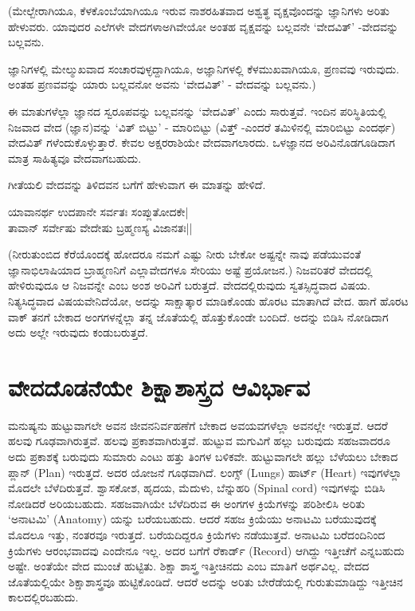 (ಮೇಲ್ಬೇರಾಗಿಯೂ, ಕೆಳಕೊಂಬೆಯಾಗಿಯೂ ಇರುವ ನಾಶರಹಿತವಾದ ಅಶ್ವತ್ಥ  ವೃಕ್ಷವೊಂದನ್ನು ಜ್ಞಾನಿಗಳು ಅರಿತು ಹೇಳುವರು. ಯಾವುದರ ಎಲೆಗಳೇ ವೇದಗಳಾಅಗಿವೇಯೋ ಅಂತಹ ವೃಕ್ಷವನ್ನು ಬಲ್ಲವನೇ `ವೇದವಿತ್' -ವೇದವನ್ನು  ಬಲ್ಲವನು.

ಜ್ಞಾನಿಗಳಲ್ಲಿ ಮೇಲ್ಮುಖವಾದ ಸಂಚಾರವುಳ್ಳದ್ದಾಗಿಯೂ, ಅಜ್ಞಾನಿಗಳಲ್ಲಿ ಕೆಳಮುಖವಾಗಿಯೂ, ಪ್ರಣವವು ಇರುವುದು. ಅಂತಹ ಪ್ರಣವವನ್ನು ಯಾರು ಬಲ್ಲವನೋ ಅವನು `ವೇದವಿತ್' - ವೇದವನ್ನು ಬಲ್ಲವನು.)

ಈ ಮಾತುಗಳೆಲ್ಲಾ ಜ್ಞಾನದ ಸ್ವರೂಪವನ್ನು ಬಲ್ಲವನನ್ನು `ವೇದವಿತ್' ಎಂದು ಸಾರುತ್ತವೆ. ಇಂದಿನ ಪರಿಸ್ಥಿತಿಯಲ್ಲಿ ನಿಜವಾದ ವೇದ (ಜ್ಞಾನ)ವನ್ನು `ವಿತ್ ಬಿಟ್ಟು' - ಮಾರಿಬಿಟ್ಟು (ವಿತ್ತ್ -ಎಂದರೆ ತಮಿಳಿನಲ್ಲಿ ಮಾರಿಬಿಟ್ಟು ಎಂದರ್ಥ) ವೇದವಿತ್ ಗಳೆಂದುಕೊಳ್ಳುತ್ತಾರೆ. ಕೇವಲ ಅಕ್ಷರರಾಶಿಯೇ ವೇದವಾಗಲಾರದು. ಒಳಜ್ಞಾನದ ಅರಿವಿನೊಡಗೂಡಿದಾಗ ಮಾತ್ರ  ಸಾಹಿತ್ಯವೂ ವೇದವಾಗಬಹುದು.

ಗೀತೆಯಲಿ ವೇದವನ್ನು ತಿಳಿದವನ ಬಗೆಗೆ ಹೇಳುವಾಗ ಈ ಮಾತನ್ನು ಹೇಳಿದೆ.
\begin{shloka}
ಯಾವಾನರ್ಥ ಉದಪಾನೇ ಸರ್ವತಃ ಸಂಪ್ಲುತೋದಕೇ|\\
ತಾವಾನ್ ಸರ್ವೇಷು ವೇದೇಷು ಬ್ರಹ್ಮಣಸ್ಯ ವಿಜಾನತಃ||
\end{shloka}

(ನೀರುತುಂಬಿದ ಕೆರೆಯೊಂದಕ್ಕೆ  ಹೋದರೂ ನಮಗೆ ಎಷ್ಟು ನೀರು ಬೇಕೋ ಅಷ್ಟನ್ನೇ ನಾವು ಪಡೆಯುವಂತೆ ಜ್ಞಾನಾಭಿಲಾಷಿಯಾದ ಬ್ರಾಹ್ಮಣನಿಗೆ ಎಲ್ಲಾವೇದಗಳೂ ಸೇರಿಯು ಅಷ್ಟೆ ಪ್ರಯೋಜನ.) ನಿಜವರಿತರೆ ವೇದದಲ್ಲಿ ಹೇಳಿರುವುದೂ ಆ ನಿಜವನ್ನೇ ಎಂಬ ಅಂಶ ಅರಿವಿಗೆ ಬರುತ್ತದೆ. ವೇದದಲ್ಲಿರುವುದು ಸ್ವತಸ್ಸಿದ್ಧವಾದ ವಿಷಯ. ನಿತ್ಯಸಿದ್ಧವಾದ ವಿಷಯವೇನಿದೆಯೋ, ಅದನ್ನು ಸಾಕ್ಷಾತ್ಕಾರ ಮಾಡಿಕೊಂಡು ಹೊರಟ ಮಾತಾಗಿದೆ ವೇದ. ಹಾಗೆ ಹೊರಟ ವಾಕ್ ತನಗೆ ಬೇಕಾದ ಅಂಗಗಳನ್ನೆಲ್ಲಾ ತನ್ನ ಜೊತೆಯಲ್ಲಿ ಹೊತ್ತುಕೊಂಡೇ ಬಂದಿದೆ. ಅದನ್ನು ಬಿಡಿಸಿ ನೋಡಿದಾಗ ಅದು ಅಲ್ಲೇ ಇರುವುದು ಕಂಡುಬರುತ್ತದೆ.

\section*{ವೇದದೊಡನೆಯೇ ಶಿಕ್ಷಾಶಾಸ್ತ್ರದ ಆವಿರ್ಭಾವ}

ಮನುಷ್ಯನು ಹುಟ್ಟುವಾಗಲೇ ಅವನ ಜೀವನನಿರ್ವಹಣೆಗೆ ಬೇಕಾದ ಅವಯವಗಳೆಲ್ಲಾ ಅವನಲ್ಲೇ ಇರುತ್ತವೆ. ಆದರೆ ಹಲವು ಗೂಢವಾಗಿರುತ್ತವೆ. ಹಲವು ಪ್ರಕಾಶವಾಗಿರುತ್ತವೆ. ಹುಟ್ಟುವ ಮಗುವಿಗೆ ಹಲ್ಲು ಬರುವುದು ಸಹಜವಾದರೂ ಅದು ಪ್ರಕಾಶಕ್ಕೆ ಬರುವುದು ಸುಮಾರು ಎಂಟು ಹತ್ತು ತಿಂಗಳ ಬಳಿಕವೇ. ಹುಟ್ಟುವಾಗಲೇ ಹಲ್ಲು ಬೆಳೆಯಲು ಬೇಕಾದ ಪ್ಲಾನ್ (Plan) ಇರುತ್ತದೆ. ಅದರ ಯೋಜನೆ ಗೂಢವಾಗಿದೆ. ಲಂಗ್ಸ್  (Lungs) ಹಾರ್ಟ್ (Heart) ಇವುಗಳೆಲ್ಲಾ ಮೊದಲೇ ಬೆಳೆದಿರುತ್ತವೆ. ಶ್ವಾಸಕೋಶ, ಹೃದಯ, ಮೆದುಳು, ಬೆನ್ನುಹರಿ (Spinal cord)  ಇವುಗಳನ್ನು    ಬಿಡಿಸಿ 
ನೋಡಿದರೆ ಅರಿಯಬಹುದು. ಸಹಜವಾಗಿಯೇ ಬೆಳೆದಿರುವ ಈ ಅಂಗಗಳ ಕ್ರಿಯೆಗಳನ್ನು ಪರಿಶೀಲಿಸಿ ಅರಿತು `ಅನಾಟಮಿ' (Anatomy) ಯನ್ನು ಬರೆಯಬಹುದು. ಆದರೆ ಸಹಜ ಕ್ರಿಯೆಯು ಅನಾಟಮಿ ಬರೆಯುವುದಕ್ಕೆ  ಮೊದಲೂ ಇತ್ತು, ನಂತರವೂ ಇರುತ್ತದೆ. ಬರೆಯದಿದ್ದರೂ ಕ್ರಿಯೆಗಳು ನಡೆಯುತ್ತವೆ. ಅನಾಟಮಿ ಬರೆದಂದಿನಿಂದ ಕ್ರಿಯೆಗಳು ಆರಂಭವಾದವು ಎಂದೇನೂ ಇಲ್ಲ. ಅದರ ಬಗೆಗೆ ರೆಕಾರ್ಡ್ 
(Record) ಆಗಿದ್ದು ಇತ್ತೀಚೆಗೆ ಎನ್ನಬಹುದು ಅಷ್ಟೇ. ಅಂತೆಯೇ ವೇದ ಮುಂಚೆ ಹುಟ್ಟಿತು. ಶಿಕ್ಷಾ ಶಾಸ್ತ್ರ ಇತ್ತೀಚಿನದು ಎಂಬ ಮಾತಿಗೆ ಅರ್ಥವಿಲ್ಲ. ವೇದದ ಜೊತೆಯಲ್ಲಿಯೇ ಶಿಕ್ಷಾಶಾಸ್ತ್ರವೂ ಹುಟ್ಟಿಕೊಂಡಿದೆ. ಆದರೆ ಅದನ್ನು ಅರಿತು ಬೇರೆಡೆಯಲ್ಲಿ ಗುರುತುಮಾಡಿದ್ದು ಇತ್ತೀಚಿನ ಕಾಲದಲ್ಲಿರಬಹುದು.


